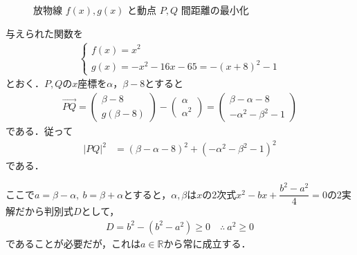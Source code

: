 \documentclass[../../main.tex]{subfiles}
\begin{document}
\begin{figure}[htb]
\begin{center}
  \end{center}
  \caption{放物線 $f(x), g(x)$ と動点 $P, Q$ 間距離の最小化}
\end{figure}

与えられた関数を
\begin{align}
  \begin{cases}
    f(x)=x^2 \\
    g(x)=-x^2-16x-65=-(x+8)^2-1
  \end{cases}
\end{align}
とおく．$P,Q$の$x$座標を$\alpha$，$\beta-8$とすると
\begin{align}
  \overrightarrow{PQ}=
  \begin{pmatrix}\beta-8\\g(\beta-8)
  \end{pmatrix}-
  \begin{pmatrix}\alpha\\\alpha^2
  \end{pmatrix}=
  \begin{pmatrix}\beta-\alpha-8\\-\alpha^2-\beta^2-1
  \end{pmatrix}
\end{align}
である．従って
\begin{align}
  |PQ|^2
  &= \left(\beta-\alpha-8\right)^2 + \left(-\alpha^2-\beta^2-1\right)^2 \label{eq:1}
\end{align}
である．

ここで$a=\beta-\alpha,\ b=\beta+\alpha$とすると，$\alpha,\beta$は$x$の2次式$x^2-bx+\dfrac{b^2-a^2}{4}=0$の2実解だから判別式$D$として，
\begin{align}
  D=b^2-(b^2-a^2)\ge0 \quad\therefore\ a^2\ge0
\end{align}
であることが必要だが，これは$a\in\mathbb{R}$から常に成立する．
\end{document}
